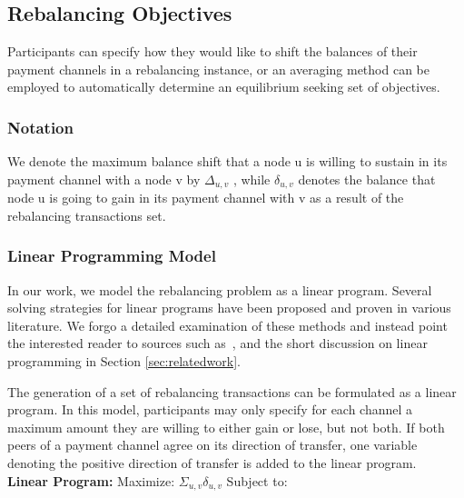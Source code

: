 \documentclass[sigconf]{acmart}
\begin{document}
\subsection{Rebalancing Objectives}
\label{objectives}

Participants can specify how they would like to shift the balances of their payment channels in a rebalancing instance, or an averaging method can be employed to automatically determine an equilibrium seeking set of objectives.

\subsubsection{Notation}
We denote the maximum balance shift that a node u is willing to sustain in its payment channel with a node v by $\Delta_{u,v}$
, while $\delta_{u,v}$ denotes the balance that node u is going to gain in its payment channel with v as a result of the rebalancing transactions set.

\subsubsection{Linear Programming Model}
\label{linprog}

In our work, we model the rebalancing problem as a linear program. Several solving strategies for linear programs have been proposed and proven in various literature. We forgo a detailed examination of these methods and instead point the interested reader to sources such as~\cite{eiselt2007linear}, and the short discussion on linear programming in Section \ref{sec:relatedwork}.

The generation of a set of rebalancing transactions can be formulated as a linear program. In this model, participants may only specify for each channel a maximum amount they are willing to either gain or lose, but not both. If both peers of a payment channel agree on its direction of transfer, one variable denoting the positive direction of transfer is added to the linear program.\\

\noindent
\textbf{Linear Program:} Maximize: $\Sigma_{u,v} \delta_{u,v}$ Subject to:
\end{document}
